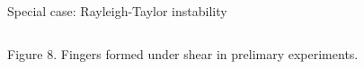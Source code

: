 \documentclass[final]{beamer} %
\begin{document}
\begin{frame}[t]
\begin{block}{Special case: Rayleigh-Taylor instability}
\begin{columns}[t]
\begin{column}{0.3\paperwidth}
        \centering \footnotesize Figure 8. Fingers formed under shear in prelimary experiments. \\
        
      \end{column}

    \end{columns}
        
  \end{block}

\end{frame}
\end{document}
